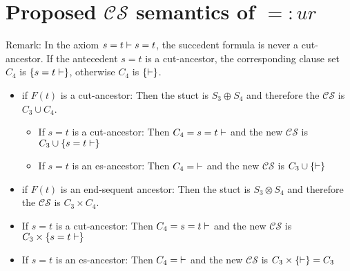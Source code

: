 \documentclass[a4paper]{article}
\newcommand{\ccs}[0]{\ensuremath{\mathcal{C}\mathcal{S}}}
\newcommand{\set}[1]{\ensuremath{\{#1\}}}
\begin{document}
\section{Proposed \ccs{} semantics of $=:ur$}
Remark: In the axiom $s=t \vdash s=t $, the succedent formula is never a cut-ancestor. If the antecedent $s=t$ is a cut-ancestor, the corresponding clause set $C_4$ is $\set{s=t \lkproves}$, otherwise $C_4$ is $\set{\lkproves}$.\\

\begin{itemize}
\item if $F(t)$ is a cut-ancestor: Then the stuct is $S_3 \oplus S_4$ and therefore the \ccs{} is $C_3 \cup C_4$.
  \begin{itemize}
  \item If $s=t$ is a cut-ancestor: Then $C_4={s=t \vdash}$ and the new \ccs{} is $C_3 \cup \set{s=t \lkproves} $
  \item If $s=t$ is an es-ancestor: Then $C_4={ \vdash}$ and the new \ccs{} is $C_3 \cup \set{\lkproves} $
  \end{itemize}
 
\item if $F(t)$ is an end-sequent ancestor: Then the stuct is $S_3 \otimes S_4$ and therefore the \ccs{} is $C_3 \times C_4$.
  \item If $s=t$ is a cut-ancestor: Then $C_4={s=t \vdash}$ and the new \ccs{} is $C_3 \times \set{s=t \lkproves} $
  \item If $s=t$ is an es-ancestor: Then $C_4={ \vdash}$ and the new \ccs{} is $C_3 \times \set{\lkproves} = C_3$
\end{itemize}
\end{document}
